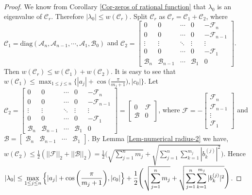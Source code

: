 \documentclass[12pt, reqno]{amsart}
\theoremstyle{definition}
\theoremstyle{remark}
\numberwithin{equation}{section}
\begin{document}
\begin{proof}
We know from Corollary \ref{Cor-zeros of rational function} that $\lambda_0$ is 
an eigenvalue of $\mathcal{C}_r$. Therefore 
$|\lambda_0| \leq w(\mathcal{C}_r)$. Split $\mathcal{C}_r$ as $\mathcal{C}_r 
= \mathcal{C}_1 + \mathcal{C}_2$, where $\mathcal{C}_1 = 
\text{diag}(\mathcal{A}_n,\mathcal{A}_{n-1}, \cdots , \mathcal{A}_1, \mathcal{B}_0)$  
and $\mathcal{C}_2 = \begin{bmatrix}
0 & 0 & \cdots & 0 & -\mathcal{F}_n \\
0 & 0 & \cdots & 0 & -\mathcal{F}_{n-1} \\
\vdots & \vdots & \ddots & \vdots & \vdots \\
0 & 0 & \cdots & 0 & -\mathcal{F}_1 \\
\mathcal{B}_n & \mathcal{B}_{n-1} & \cdots & \mathcal{B}_1 & 0
\end{bmatrix}$. Then $w(\mathcal{C}_r) \leq w(\mathcal{C}_1) + 
w(\mathcal{C}_2)$. It is easy to see that $w(\mathcal{C}_1) \leq \displaystyle 
\max_{1 \leq j \leq n} \Big\{|a_j| + \cos\Big(\frac{\pi}{m_j+1}\Big), |c_0| \Big\}$. 
Let $\mathcal{C}_2 = \begin{bmatrix}
0 & 0 & \cdots & 0 & -\mathcal{F}_n \\
0 & 0 & \cdots & 0 & -\mathcal{F}_{n-1} \\
\vdots & \vdots & \ddots & \vdots & \vdots \\
0 & 0 & \cdots & 0 & -\mathcal{F}_1 \\
\mathcal{B}_n & \mathcal{B}_{n-1} & \cdots & \mathcal{B}_1 & 0
\end{bmatrix} = \begin{bmatrix}
0 & \mathcal{F} \\
\mathcal{B} & 0
\end{bmatrix}$, where $\mathcal{F} = -\begin{bmatrix}
\mathcal{F}_n \\
\mathcal{F}_{n-1} \\
\vdots \\
\mathcal{F}_1
\end{bmatrix}$ and $ \mathcal{B} = \begin{bmatrix}
\mathcal{B}_n & \mathcal{B}_{n-1} & \cdots & \mathcal{B}_1
\end{bmatrix}$. By Lemma \ref{Lem-numerical radius-2} we have, $w(\mathcal{C}_2) 
\leq \displaystyle \frac{1}{2} (||\mathcal{F}||_2+ ||\mathcal{B}||_2) = \frac{1}{2} 
\Bigg( \sqrt{\sum _{j=1}^{n}m_j} + \sqrt{\sum_{j=1}^{n} 
\sum_{k=1}^{m_j}|b_k^{(j)}|^2} \Bigg)$. Hence $|\lambda_0| \leq \displaystyle 
\max_{1 \leq j \leq n} \Big\{|a_j| + \cos\bigg(\frac{\pi}{m_j+1}\bigg), |c_0| \Big\}\\
 + \frac{1}{2} \Bigg( \sqrt{\sum _{j=1}^{n}m_j} + \sqrt{\sum_{j=1}^{n} 
\sum_{k=1}^{m_j}|b_k^{(j)}|^2} \Bigg)$. 
\end{proof}
\end{document}
